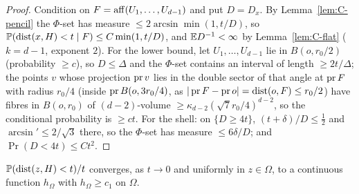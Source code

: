 \begin{proof}
Condition on $F = \operatorname{aff}(U_1, \dots, U_{d-1})$ and put $D = D_x$. By Lemma~\ref{lem:C-pencil} the $\Phi$-set has measure
$\le 2\arcsin\min(1, t/D)$, so $\mathbb{P}(\operatorname{dist}(x, H) < t \mid F) \le C\min(1, t/D)$, and $\mathbb{E} D^{-1} < \infty$ by
Lemma~\ref{lem:C-flat} ($k = d - 1$, exponent $2$). For the lower bound, let $U_1, \dots, U_{d-1}$ lie in
$B(o, r_0/2)$ (probability $\ge c$), so $D \le \Delta$ and the $\Phi$-set contains an interval of length $\ge 2t/\Delta$;
the points $v$ whose projection $\operatorname{pr} v$ lies in the double sector of that angle at $\operatorname{pr} F$ with radius $r_0/4$
(inside $\operatorname{pr} B(o, 3r_0/4)$, as $|\operatorname{pr} F - \operatorname{pr} o| = \operatorname{dist}(o, F) \le r_0/2$) have fibres in $B(o, r_0)$ of
$(d-2)$-volume $\ge \kappa_{d-2}(\sqrt7r_0/4)^{d-2}$, so the conditional probability is $\ge ct$. For the shell: on
$\{D \ge 4t\}$, $(t + \delta)/D \le \frac12$ and $\arcsin' \le 2/\sqrt3$ there, so the $\Phi$-set has measure
$\le 6\delta/D$; and $\Pr(D < 4t) \le Ct^2$.
\end{proof}

\begin{lemma}[Density at $0$]\label{lem:C-density}
$\mathbb{P}(\operatorname{dist}(z, H) < t)/t$ converges, as $t \to 0$ and uniformly in $z \in \Omega$, to a continuous function $h_\Omega$ with
$h_\Omega \ge c_1$ on $\Omega$.
\end{lemma}

